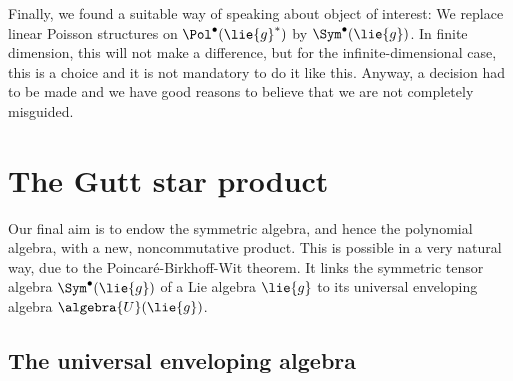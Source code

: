 Finally, we found a suitable way of speaking about object of interest: We 
replace linear Poisson structures on $\Pol^{\bullet}(\lie{g}^*)$ by 
$\Sym^{\bullet}(\lie{g})$. In finite dimension, this will not make a 
difference, but for the infinite-dimensional case, this is a choice and it is 
not mandatory to do it like this. Anyway, a decision had to be made and we 
have good reasons to believe that we are not completely misguided.



\section{The Gutt star product}
\label{sec:chap3_GuttStar}

Our final aim is to endow the symmetric algebra, and hence the polynomial 
algebra, with a new, noncommutative product. This is possible in a very 
natural way, due to the Poincar\'e-Birkhoff-Wit theorem. It links the 
symmetric tensor algebra $\Sym^{\bullet}(\lie{g})$ of a Lie algebra $\lie{g}$ 
to its universal enveloping algebra $\algebra{U}(\lie{g})$.


\subsection{The universal enveloping algebra}
\label{subsec:chap3_UniversalEnvelopingAlgebra}

